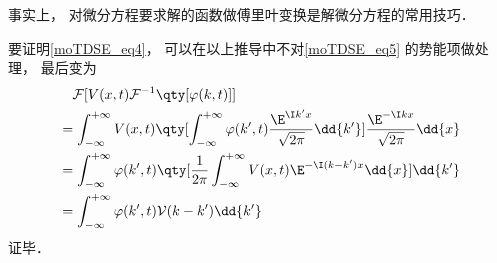 事实上， 对微分方程要求解的函数做傅里叶变换是解微分方程的常用技巧． %

要证明\autoref{moTDSE_eq4}， 可以在以上推导中不对\autoref{moTDSE_eq5} 的势能项做处理， 最后变为
\begin{equation}
\begin{aligned}
&\quad\mathcal{F}[V(x, t)\mathcal{F}^{-1}\qty[\varphi(k, t)]]\\
&= \int_{-\infty}^{+\infty}V(x, t) \qty[\int_{-\infty}^{+\infty} \varphi(k', t) \frac{\E^{\I k'x}}{\sqrt{2\pi}} \dd{k'}] \frac{\E^{-\I kx}}{\sqrt{2\pi}} \dd{x}\\
&= \int_{-\infty}^{+\infty} \varphi(k', t)\qty[\frac{1}{2\pi}\int_{-\infty}^{+\infty} V(x, t)\E^{-\I (k-k')x} \dd{x}] \dd{k'}\\
&= \int_{-\infty}^{+\infty} \varphi(k', t) \mathcal{V}(k-k')  \dd{k'}
\end{aligned}
\end{equation}
证毕．
